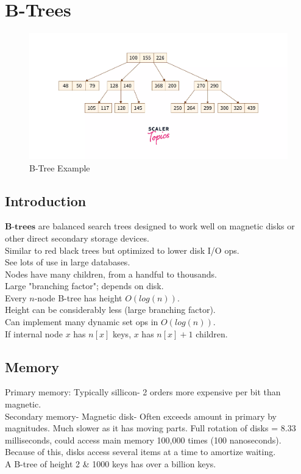 \documentclass{article}
\begin{document}
\section{B-Trees}
\begin{figure}[htp]
    \includegraphics[width=\textwidth]{btree.png}
    \caption{B-Tree Example}
    \label{tab:placeholder}
\end{figure}
\subsection{Introduction}
$\textbf{B-trees}$ are balanced search trees designed to work well on magnetic disks or other direct secondary storage devices.\\
Similar to red black trees but optimized to lower disk I/O ops.\\
See lots of use in large databases.\\
Nodes have many children, from a handful to thousands.\\
Large "branching factor"; depends on disk.\\
Every $n$-node B-tree has height $O(log(n))$.\\
Height can be considerably less (large branching factor).\\
Can implement many dynamic set ops in $O(log(n))$.\\
If internal node $x$ has $n[x]$ keys, $x$ has $n[x]+1$ children.\\
\subsection{Memory}
Primary memory: Typically sillicon- 2 orders more expensive per bit than magnetic.\\
Secondary memory- Magnetic disk- Often exceeds amount in primary by magnitudes. Much slower as it has moving parts. Full rotation of disks = 8.33 milliseconds, could access main memory 100,000 times (100 nanoseconds).\\
Because of this, disks access several items at a time to amortize waiting.\\
A B-tree of height 2 \& 1000 keys has over a billion keys.\\
\end{document}
